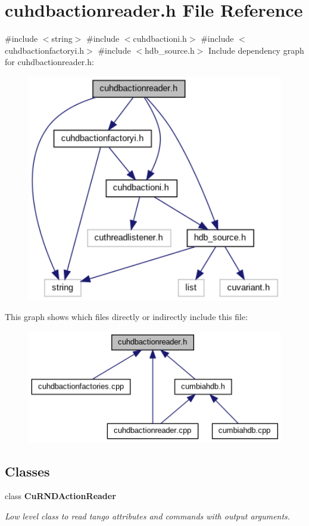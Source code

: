 \section{cuhdbactionreader.\+h File Reference}
\label{cuhdbactionreader_8h}
{\ttfamily \#include $<$string$>$}\newline
{\ttfamily \#include $<$cuhdbactioni.\+h$>$}\newline
{\ttfamily \#include $<$cuhdbactionfactoryi.\+h$>$}\newline
{\ttfamily \#include $<$hdb\+\_\+source.\+h$>$}\newline
Include dependency graph for cuhdbactionreader.\+h\+:
\nopagebreak
\begin{figure}[H]
\begin{center}
\leavevmode
\includegraphics[width=350pt]{cuhdbactionreader_8h__incl}
\end{center}
\end{figure}
This graph shows which files directly or indirectly include this file\+:
\nopagebreak
\begin{figure}[H]
\begin{center}
\leavevmode
\includegraphics[width=350pt]{cuhdbactionreader_8h__dep__incl}
\end{center}
\end{figure}
\subsection*{Classes}
\begin{DoxyCompactItemize}
\item 
class \textbf{ Cu\+R\+N\+D\+Action\+Reader}
\begin{DoxyCompactList}\small\item\em Low level class to read tango attributes and commands with output arguments. \end{DoxyCompactList}\end{DoxyCompactItemize}

